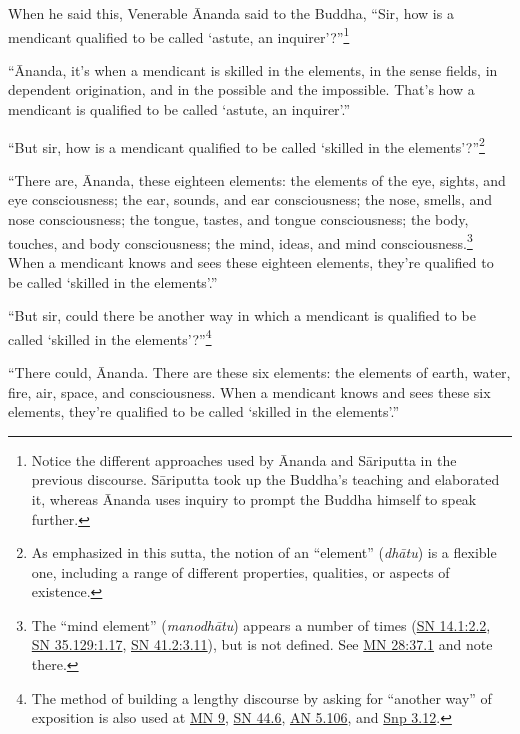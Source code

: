 \documentclass[12pt,openany]{book}%
\begin{document}
When he said this, Venerable Ānanda said to the Buddha, “Sir, how is a mendicant qualified to be called ‘astute, an inquirer’?”\footnote{Notice the different approaches used by Ānanda and \textsanskrit{Sāriputta} in the previous discourse. \textsanskrit{Sāriputta} took up the Buddha’s teaching and elaborated it, whereas Ānanda uses inquiry to prompt the Buddha himself to speak further. } 

“Ānanda, it’s when a mendicant is skilled in the elements, in the sense fields, in dependent origination, and in the possible and the impossible. That’s how a mendicant is qualified to be called ‘astute, an inquirer’.” 

“But sir, how is a mendicant qualified to be called ‘skilled in the elements’?”\footnote{As emphasized in this sutta, the notion of an “element” (\textit{\textsanskrit{dhātu}}) is a flexible one, including a range of different properties, qualities, or aspects of existence. } 

“There are, Ānanda, these eighteen elements: the elements of the eye, sights, and eye consciousness; the ear, sounds, and ear consciousness; the nose, smells, and nose consciousness; the tongue, tastes, and tongue consciousness; the body, touches, and body consciousness; the mind, ideas, and mind consciousness.\footnote{The “mind element” (\textit{\textsanskrit{manodhātu}}) appears a number of times (\href{https://suttacentral.net/sn14.1/en/sujato\#2.2}{SN 14.1:2.2}, \href{https://suttacentral.net/sn35.129/en/sujato\#1.17}{SN 35.129:1.17}, \href{https://suttacentral.net/sn41.2/en/sujato\#3.11}{SN 41.2:3.11}), but is not defined. See \href{https://suttacentral.net/mn28/en/sujato\#37.1}{MN 28:37.1} and note there. } When a mendicant knows and sees these eighteen elements, they’re qualified to be called ‘skilled in the elements’.” 

“But sir, could there be another way in which a mendicant is qualified to be called ‘skilled in the elements’?”\footnote{The method of building a lengthy discourse by asking for “another way” of exposition is also used at \href{https://suttacentral.net/mn9/en/sujato}{MN 9}, \href{https://suttacentral.net/sn44.6/en/sujato}{SN 44.6}, \href{https://suttacentral.net/an5.106/en/sujato}{AN 5.106}, and \href{https://suttacentral.net/snp3.12/en/sujato}{Snp 3.12}. } 

“There could, Ānanda. There are these six elements: the elements of earth, water, fire, air, space, and consciousness. When a mendicant knows and sees these six elements, they’re qualified to be called ‘skilled in the elements’.” 
\end{document}
